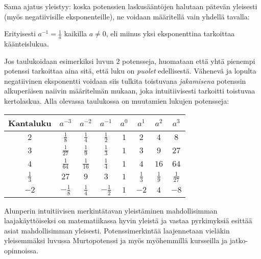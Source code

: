 Sama ajatus yleistyy: koska potenssien laskusääntöjen halutaan pätevän yleisesti (myös negatiivisille eksponenteille), ne voidaan määritellä vain yhdellä tavalla:
  

Erityisesti $a^{-1}=\frac{1}{a}$ kaikilla $a \neq 0$, eli miinus yksi eksponenttina tarkoittaa käänteislukua.
    
\begin{esimerkki}
\end{esimerkki}

\begin{esimerkki}
Jos taulukoidaan esimerkiksi luvun $2$ potensseja, huomataan että yhtä pienempi potenssi tarkoittaa aina sitä, että luku on \emph{puolet} edellisestä. Vähenevä ja lopulta negatiivinen eksponentti voidaan siis tulkita toistuvana \textit{jakamisena} potenssin alkuperäisen naiivin määritelmän mukaan, joka intuitiivisesti tarkoitti toistuvaa kertolaskua. Alla olevassa taulukossa on muutamien lukujen potensseja:
  
\begin{tabular}{c|c c c c c c c}
Kantaluku & $a^{-3}$ & $a^{-2}$ & $a^{-1}$ & $a^0$ & $a^1$ & $a^2$ & $a^3$ \\
\hline
$2$ & $\frac{1}{8}$ & $\frac{1}{4}$ & $\frac{1}{2}$ & $1$ & $2$ & $4$ & $8$ \\
$3$ & $\frac{1}{27}$ & $\frac{1}{9}$ & $\frac{1}{3}$ & $1$ & $3$ & $9$ & $27$ \\
$4$ & $\frac{1}{64}$ & $\frac{1}{16}$ & $\frac{1}{4}$ & $1$ & $4$ & $16$ & $64$ \\
$\frac{1}{3}$ & $27$ & $9$ & $3$ & $1$ & $\frac{1}{3}$ & $\frac{1}{9}$ & $\frac{1}{27}$ \\
$-2$ & $-\frac{1}{8}$ & $\frac{1}{4}$ & $-\frac{1}{2}$ & $1$ & $-2$ & $4$ & $-8$
\end{tabular}
\end{esimerkki}

Alunperin intuitiivisen merkintätavan yleistäminen mahdollisimman laajakäyttöiseksi on matematiikassa hyvin yleistä ja vastaa pyrkimyksiä esittää asiat mahdollisimman yleisesti. Potenssimerkintää laajennetaan vieläkin yleisemmäksi luvussa Murtopotenssi ja myös myöhemmillä kursseilla ja jatko-opinnoissa. %